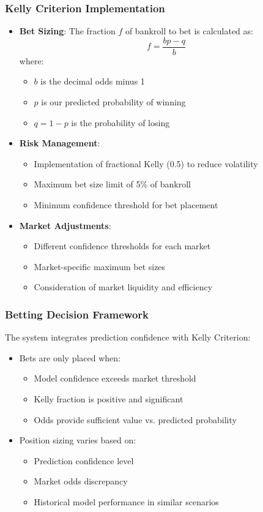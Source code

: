 \documentclass[conference]{IEEEtran}
\begin{document}
\subsubsection{Kelly Criterion Implementation}
\begin{itemize}
\item \textbf{Bet Sizing}: The fraction $f$ of bankroll to bet is calculated as:
    \[ f = \frac{bp - q}{b} \]
    where:
    \begin{itemize}
    \item $b$ is the decimal odds minus 1
    \item $p$ is our predicted probability of winning
    \item $q = 1-p$ is the probability of losing
    \end{itemize}
\item \textbf{Risk Management}:
    \begin{itemize}
    \item Implementation of fractional Kelly (0.5) to reduce volatility
    \item Maximum bet size limit of 5\% of bankroll
    \item Minimum confidence threshold for bet placement
    \end{itemize}
\item \textbf{Market Adjustments}:
    \begin{itemize}
    \item Different confidence thresholds for each market
    \item Market-specific maximum bet sizes
    \item Consideration of market liquidity and efficiency
    \end{itemize}
\end{itemize}

\subsubsection{Betting Decision Framework}
The system integrates prediction confidence with Kelly Criterion:
\begin{itemize}
\item Bets are only placed when:
    \begin{itemize}
    \item Model confidence exceeds market threshold
    \item Kelly fraction is positive and significant
    \item Odds provide sufficient value vs. predicted probability
    \end{itemize}
\item Position sizing varies based on:
    \begin{itemize}
    \item Prediction confidence level
    \item Market odds discrepancy
    \item Historical model performance in similar scenarios
    \end{itemize}
\end{itemize}
\end{document}
